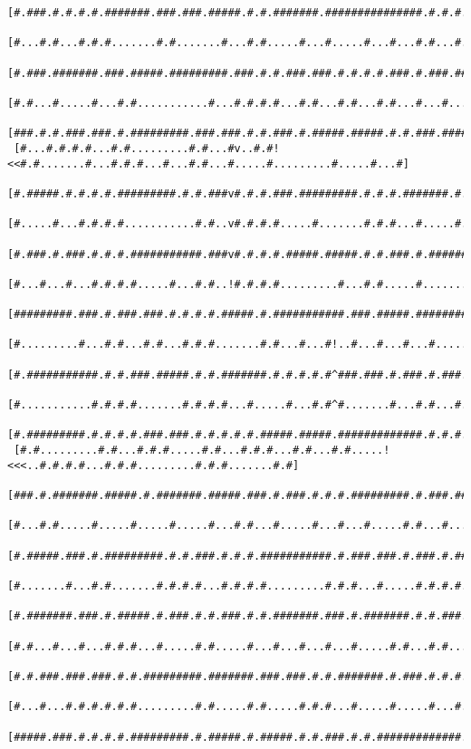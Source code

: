\documentclass[a4paper,10pt,ngerman]{scrartcl}
\begin{document}
\begin{lstlisting}[frame=tb,basicstyle=\tiny\ttfamily]
 [#.###.#.#.#.#.#######.###.###.#####.#.#.#######.###############.#.#.#.###.###.###############.#####.#]
 [#...#.#...#.#.#.......#.#.......#...#.#.....#...#.....#...#...#.#...#...#.#...#.........#.....#.....#]
 [#.###.#######.###.#####.#########.###.#.#.###.###.#.#.#.#.###.#.###.#####.#.###.###.#####.#####.#####]
 [#.#...#.....#...#.#...........#...#.#.#.#...#.#...#.#...#.#...#...#.....#.#.....#.#.......#.#.......#]
 [###.#.#.###.###.#.#########.###.###.#.#.###.#.#####.#####.#.#.###.#####.#.#######.#########.#.#####.#]
 [#...#.#.#.#...#.#.........#.#...#v..#.#!<<#.#.......#...#.#.#...#...#.#...#.....#.........#.....#...#]
 [#.#####.#.#.#.#.#########.#.#.###v#.#.#.###.#########.#.#.#.#######.#.###.#####.#.#######.#.#####.#.#]
 [#.....#...#.#.#.#...........#.#..v#.#.#.#.....#.......#.#.#...#.....#...........#.#...#...#.#.#...#.#]
 [#.###.#.###.#.#.#.###########.###v#.#.#.#.#####.#####.#.#.###.#.#################.#.#.#.###.#.#.###.#]
 [#...#...#...#.#.#.#.....#...#.#..!#.#.#.#.........#...#.#.....#...................#.#.#.......#.#.#.#]
 [#########.###.#.###.###.#.#.#.#.#####.#.###########.###.#####.#####################.###########.#.#.#]
 [#.........#...#.#...#.#...#.#.#.......#.#...#...#!..#...#...#...#.....#...........#.......#...#.#...#]
 [#.###########.#.#.###.#####.#.#.#######.#.#.#.#.#^###.###.#.###.#.###.###.#######.#.#####.#.#.#.#.###]
 [#...........#.#.#.#.......#.#.#.#...#.....#...#.#^#.......#...#.#...#.#...#.......#...#...#.#...#...#]
 [#.#########.#.#.#.#.###.###.#.#.#.#.#.#####.#####.#############.#.#.#.#.###.###########.#.#.#######.#]
 [#.#.........#.#...#.#.#.....#.#...#.#.#...#.#...#.#.....!<<<..#.#.#.#...#.#.#.........#.#.#.......#.#]
 [###.#.#######.#####.#.#######.#####.###.#.###.#.#.#.#########.#.###.#####.#.#.#######.#.#####.###.#.#]
 [#...#.#.....#.....#.....#.....#...#.#...#.....#...#...#.....#.#...#....!#.#.#...#...#...#...#.#...#.#]
 [#.#####.###.#.#########.#.#.###.#.#.#.###########.#.###.###.#.###.#.###^#.#.###.#.#.#.###.#.###.###.#]
 [#.......#...#.#.......#.#.#.#...#.#.#.#.........#.#.#...#.....#.#.#.#..^#...#...#.#...#...#.....#...#]
 [#.#######.###.#.#####.#.###.#.#.###.#.#.#######.###.#.#######.#.#.###.###.###.###.#####.#########.###]
 [#.#...#...#...#.#.#...#.....#.#.....#...#...#...#...#.....#.#...#.#...#.......#.#...#...#.......#...#]
 [#.#.###.###.###.#.#.#########.#######.###.###.#.#.#######.#.###.#.#.#.#########.#.###.###.#####.###.#]
 [#...#...#.#.#.#.#.#.........#.#.....#.#.....#.#.#...#.....#.....#...#.#.....#.#...#...#.#.#.#.....#.#]
 [#####.###.#.#.#.#.#########.#.#####.#.#####.#.#.###.#.#.#############.#.###.#.#.###.###.#.#.#.#####.#]

\end{lstlisting}
\end{document}
